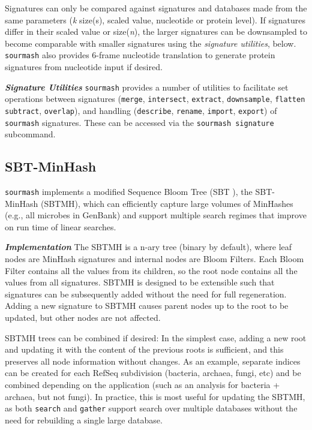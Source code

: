 \documentclass[10pt,a4paper,twocolumn]{article}
\begin{document}
Signatures can only be compared against signatures and databases made from the same parameters (\textit{k} size(s), scaled value, nucleotide or protein level). If signatures differ in their scaled value or size(\textit{n}), the larger signatures can be downsampled to become comparable with smaller signatures using the \textit{signature utilities}, below. \lstinline{sourmash} also provides 6-frame nucleotide translation to generate protein signatures from nucleotide input if desired.

\textit{\textbf{Signature Utilities}} \lstinline{sourmash} provides a number of utilities to facilitate set operations between signatures (\lstinline{merge}, \lstinline{intersect}, \lstinline{extract}, \lstinline{downsample}, \lstinline{flatten} \lstinline{subtract}, \lstinline{overlap}), and handling (\lstinline{describe}, \lstinline{rename},  \lstinline{import}, \lstinline{export}) of \lstinline{sourmash} signatures. These can be accessed via the \lstinline{sourmash signature} subcommand. 

\subsection*{SBT-MinHash}
\lstinline{sourmash} implements a modified Sequence Bloom Tree (SBT \cite{solomon2016fast}), the SBT-MinHash (SBTMH), which can efficiently capture large volumes of MinHashes (e.g., all microbes in GenBank) and support multiple search regimes that improve on run time of linear searches. 

\textit{\textbf{Implementation}} The SBTMH is a n-ary tree (binary by default), where leaf nodes are MinHash signatures and internal nodes are Bloom Filters. Each Bloom Filter contains all the values from its children, so the root node contains all the values from all signatures. SBTMH is designed to be extensible such that signatures can be subsequently added without the need for full regeneration. Adding a new signature to SBTMH causes parent nodes up to the root to be updated, but other nodes are not affected.

SBTMH trees can be combined if desired: In the simplest case, adding a new root and updating it with the content of the previous roots is sufficient, and this preserves all node information without changes. As an example, separate indices can be created for each RefSeq subdivision (bacteria, archaea, fungi, etc) and be combined depending on the application (such as an analysis for bacteria + archaea, but not fungi). In practice, this is most useful for updating the SBTMH, as both \lstinline{search} and  \lstinline{gather} support search over multiple databases without the need for rebuilding a single large database.
\end{document}
